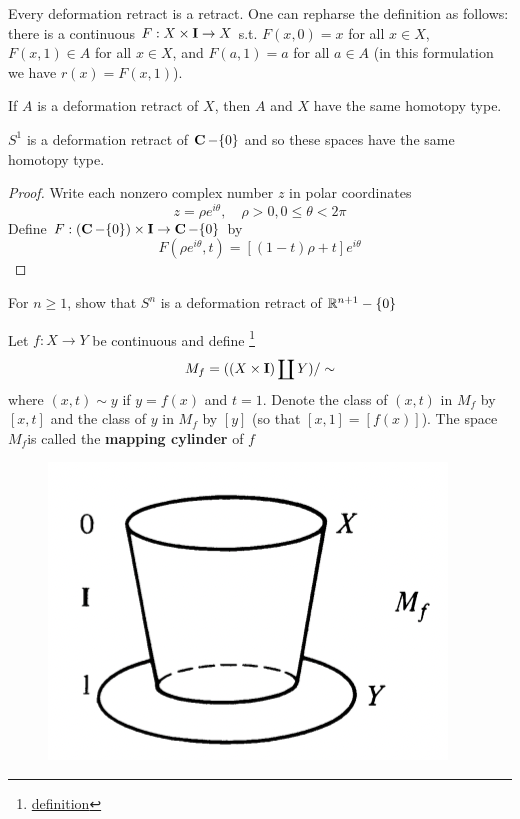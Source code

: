 \documentclass[11pt]{article}
\begin{document}
Every deformation retract is a retract. One can repharse the definition as follows: there is a
continuous \(F:X\times\operatorname{\textbf{I}}\to X\) s.t. \(F(x,0)=x\) for all \(x\in X\), \(F(x,1)\in A\) for all \(x\in X\),
and \(F(a,1)=a\) for all \(a\in A\) (in this formulation we have \(r(x)=F(x,1)\)).

\begin{theorem}[]
If \(A\) is a deformation retract of \(X\), then \(A\) and \(X\) have the same homotopy type.
\end{theorem}

\begin{corollary}[]
\(S^1\) is a deformation retract of \(\operatorname{\textbf{C}}-\{0\}\) and so these spaces have the same homotopy type.
\end{corollary}

\begin{proof}
Write each nonzero complex number \(z\) in polar coordinates
\begin{equation*}
z=\rho e^{i\theta},\quad\rho>0,0\le\theta<2\pi
\end{equation*}
Define \(F:(\operatorname{\textbf{C}}-\{0\})\times\operatorname{\textbf{I}}\to\operatorname{\textbf{C}}-\{0\}\) by
\begin{equation*}
F(\rho e^{i\theta},t)=[(1-t)\rho+t]e^{i\theta}
\end{equation*}
\end{proof}

\begin{exercise}
\label{ex1.29}
For \(n\ge 1\), show that \(S^n\) is a deformation retract of \(\mathbb{R}^{n+1}-\{0\}\)
\end{exercise}

\begin{definition}[]
Let \(f:X\to Y\) be continuous and  define \footnote{\href{https://en.wikipedia.org/wiki/Disjoint\_union\_(topology)}{definition}}
\begin{equation*}
M_f=((X\times\operatorname{\textbf{I}})\coprod Y)/\sim
\end{equation*}
where \((x,t)\sim y\) if \(y=f(x)\) and \(t=1\). Denote the class of \((x,t)\) in \(M_f\)
by \([x,t]\) and the class of \(y\) in \(M_f\) by \([y]\) (so that \([x,1]=[f(x)]\)). The
space \(M_f\)is called the \textbf{mapping cylinder} of \(f\)

\begin{figure}[htbp]
\centering
\includegraphics[width=.3\textwidth]{../images/AnIntroductionToAlgebraicTopology/4.png}
\label{}
\end{figure}
\end{definition}
\end{document}
